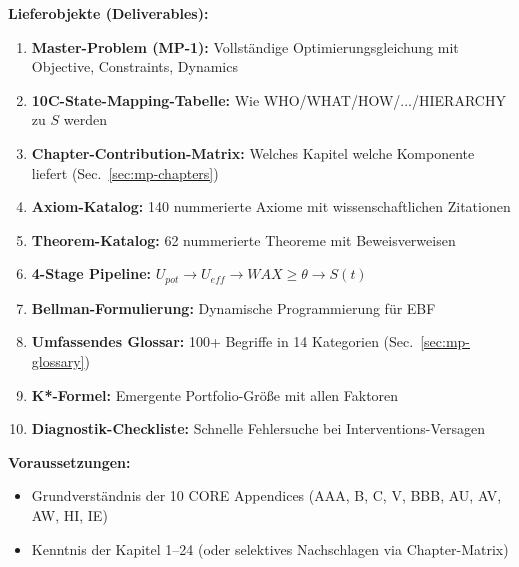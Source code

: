 \begin{tcolorbox}[colback=orange!5!white, colframe=orange!75!black,
    title=\textbf{Appendix Scope: Ziel / In-Scope / Out-of-Scope / Lieferobjekte}]
\vspace{0.5em}
\textbf{Lieferobjekte (Deliverables):}
\begin{enumerate}[nosep]
    \item \textbf{Master-Problem (MP-1):} Vollständige Optimierungsgleichung mit Objective, Constraints, Dynamics
    \item \textbf{10C-State-Mapping-Tabelle:} Wie WHO/WHAT/HOW/.../HIERARCHY zu $S$ werden
    \item \textbf{Chapter-Contribution-Matrix:} Welches Kapitel welche Komponente liefert (Sec.~\ref{sec:mp-chapters})
    \item \textbf{Axiom-Katalog:} 140 nummerierte Axiome mit wissenschaftlichen Zitationen
    \item \textbf{Theorem-Katalog:} 62 nummerierte Theoreme mit Beweisverweisen
    \item \textbf{4-Stage Pipeline:} $U_{pot} \to U_{eff} \to WAX \geq \theta \to S(t)$
    \item \textbf{Bellman-Formulierung:} Dynamische Programmierung für EBF
    \item \textbf{Umfassendes Glossar:} 100+ Begriffe in 14 Kategorien (Sec.~\ref{sec:mp-glossary})
    \item \textbf{K*-Formel:} Emergente Portfolio-Größe mit allen Faktoren
    \item \textbf{Diagnostik-Checkliste:} Schnelle Fehlersuche bei Interventions-Versagen
\end{enumerate}

\vspace{0.5em}
\textbf{Voraussetzungen:}
\begin{itemize}[nosep]
    \item Grundverständnis der 10 CORE Appendices (AAA, B, C, V, BBB, AU, AV, AW, HI, IE)
    \item Kenntnis der Kapitel 1--24 (oder selektives Nachschlagen via Chapter-Matrix)
\end{itemize}

\end{tcolorbox}


